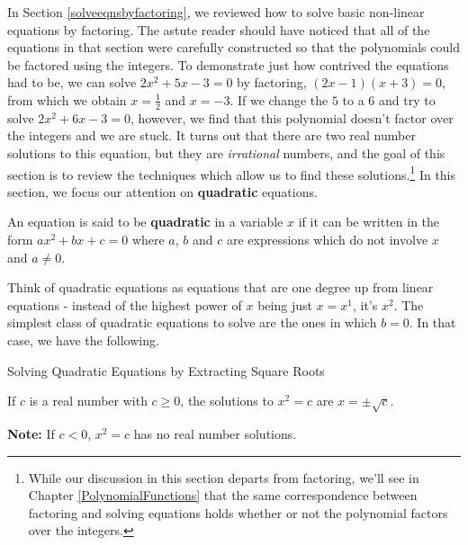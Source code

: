 

\setcounter{footnote}{0}

\label{AppQuadEqus}

In Section \ref{solveeqnsbyfactoring}, we reviewed how to solve basic non-linear equations by factoring.  The astute reader should have noticed that all of the equations in that section were carefully constructed so that the polynomials could be factored using the integers.  To demonstrate just how contrived the equations had to be, we can solve $2x^2+5x-3=0$ by factoring, $(2x-1)(x+3) = 0$, from which we obtain $x = \frac{1}{2}$ and $x = -3$.  If we change the $5$ to a $6$ and try to solve $2x^2 + 6x - 3 = 0$, however, we find that this polynomial doesn't factor over the integers and we are stuck.  It turns out that there are two real number solutions to this equation, but they are \textit{irrational} numbers, and the goal of this section is to review the techniques which allow us to find these solutions.\footnote{While our discussion in this section departs from factoring, we'll see in Chapter \ref{PolynomialFunctions} that the same correspondence between factoring and solving equations holds whether or not the polynomial factors over the integers.}  In this section, we focus our attention on \textbf{quadratic} equations.

\begin{tcolorbox}
    
\begin{defn}\label{quadeqndefn} An equation is said to be \textbf{quadratic} in a variable $x$ if it can be written in the form $ax^2 + bx + c = 0$ where $a$, $b$ and $c$ are expressions which do not involve $x$ and $a \neq 0$.

\end{defn}

\end{tcolorbox}

Think of quadratic equations as equations that are one degree up from linear equations - instead of the highest power of $x$ being just $x = x^1$, it's $x^2$.  The simplest class of quadratic equations to solve are the ones in which $b = 0$.  In that case, we have the following.

\begin{floatbox}{Solving Quadratic Equations by Extracting Square Roots}
\label{extractingthesquareroot}

\vspace{.05in}
If $c$ is a real number with $c \geq 0$, the solutions to $x^2 = c$ are $x = \pm \sqrt{c}$.

\vspace{.05in}
\textbf{Note:}  If $c < 0$, $x^2 = c$ has no real number solutions.

\end{floatbox}


